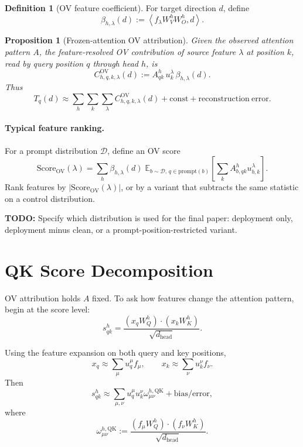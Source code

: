 \documentclass[11pt]{article}
\newcommand{\E}{\mathbb{E}}
\newcommand{\ip}[2]{\left\langle #1, #2 \right\rangle}
\newcommand{\dhead}{d_{\mathrm{head}}}
\newcommand{\OV}{\mathrm{OV}}
\newcommand{\QK}{\mathrm{QK}}
\newcommand{\todo}[1]{\textcolor{red!65!black}{\textbf{TODO:} #1}}
\theoremstyle{definition}
\newtheorem{definition}{Definition}
\theoremstyle{plain}
\newtheorem{proposition}{Proposition}
\theoremstyle{remark}
\begin{document}
\begin{definition}[OV feature coefficient]
For target direction \(d\), define
\[
  \beta_{h,\lambda}(d)
  :=
  \ip{f_\lambda W_V^h W_O^h}{d}.
\]
\end{definition}

\begin{proposition}[Frozen-attention OV attribution]
Given the observed attention pattern \(A\), the feature-resolved OV
contribution of source feature \(\lambda\) at position \(k\), read by query
position \(q\) through head \(h\), is
\[
  C^{\OV}_{h,q,k,\lambda}(d)
  :=
  A_{qk}^h\, u_k^\lambda\, \beta_{h,\lambda}(d).
\]
Thus
\[
  T_q(d)
  \approx
  \sum_h \sum_k \sum_\lambda
  C^{\OV}_{h,q,k,\lambda}(d)
  +
  \mathrm{const}
  +
  \mathrm{reconstruction\ error}.
\]
\end{proposition}

\paragraph{Typical feature ranking.}
For a prompt distribution \(\mathcal{D}\), define an OV score
\[
  \mathrm{Score}_{\OV}(\lambda)
  =
  \sum_h
  \beta_{h,\lambda}(d)
  \;
  \E_{b \sim \mathcal{D},\, q \in \mathrm{prompt}(b)}
  \left[
    \sum_k A_{b,qk}^h u_{b,k}^{\lambda}
  \right].
\]
Rank features by \(|\mathrm{Score}_{\OV}(\lambda)|\), or by a variant that
subtracts the same statistic on a control distribution.

\todo{Specify which distribution is used for the final paper: deployment only,
deployment minus clean, or a prompt-position-restricted variant.}

\section{QK Score Decomposition}

OV attribution holds \(A\) fixed.  To ask how features change the attention
pattern, begin at the score level:
\[
  s_{qk}^h =
  \frac{(x_q W_Q^h) \cdot (x_k W_K^h)}{\sqrt{\dhead}}.
\]

Using the feature expansion on both query and key positions,
\[
  x_q \approx \sum_\mu u_q^\mu f_\mu,
  \qquad
  x_k \approx \sum_\nu u_k^\nu f_\nu.
\]
Then
\[
  s_{qk}^h
  \approx
  \sum_{\mu,\nu}
  u_q^\mu u_k^\nu
  \omega_{\mu\nu}^{h,\QK}
  +
  \mathrm{bias/error},
\]
where
\[
  \omega_{\mu\nu}^{h,\QK}
  :=
  \frac{(f_\mu W_Q^h) \cdot (f_\nu W_K^h)}{\sqrt{\dhead}}.
\]
\end{document}
